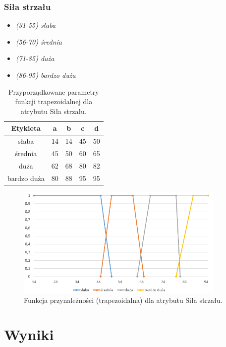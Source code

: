 \documentclass{classrep}
\begin{document}
	\subsubsection{Siła strzału}
	\begin{itemize}
		\item \textsl{(31-55) słaba}
		\item \textsl{(56-70) średnia}
		\item \textsl{(71-85) duża}
		\item \textsl{(86-95) bardzo duża}
	\end{itemize}
	\begin{table}[h!]
		\centering
		\begin{tabular} {c c c c c}
			\hline
			\textbf{Etykieta} & \textbf{a} & \textbf{b} & \textbf{c} & \textbf{d} \\ [0.5ex] 
			\hline	
			\hline 
			słaba & 14 & 14 & 45 & 50 \\
			średnia & 45 & 50 & 60 & 65  \\
			duża & 62 & 68 & 80 & 82  \\
			bardzo duża & 80 & 88 & 95 & 95  \\			
			\hline
		\end{tabular}
		\caption{Przyporządkowane parametry funkcji trapezoidalnej dla atrybutu Siła strzału. }
		\label{tabelaStrzal}
	\end{table}
	\begin{figure}[h!]
		\centering
		\includegraphics[width=0.9\textwidth]{zmienne/10.png}
		\caption{Funkcja przynależności (trapezoidalna) dla atrybutu Siła strzału.}
		\label{wykresStrzal}
	\end{figure}


	
	\section{Wyniki} %
	
\end{document}

